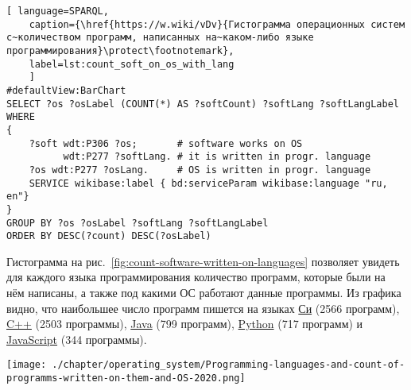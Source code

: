 % 
\begin{lstlisting}[ language=SPARQL, 
	caption={\href{https://w.wiki/vDv}{Гистограмма операционных систем с~количеством программ, написанных на~каком-либо языке программирования}\protect\footnotemark},
	label=lst:count_soft_on_os_with_lang
	]
#defaultView:BarChart
SELECT ?os ?osLabel (COUNT(*) AS ?softCount) ?softLang ?softLangLabel WHERE
{
    ?soft wdt:P306 ?os;       # software works on OS
          wdt:P277 ?softLang. # it is written in progr. language
    ?os wdt:P277 ?osLang.     # OS is written in progr. language
    SERVICE wikibase:label { bd:serviceParam wikibase:language "ru, en"}
}
GROUP BY ?os ?osLabel ?softLang ?softLangLabel
ORDER BY DESC(?count) DESC(?osLabel)
\end{lstlisting}



\newpage
Гистограмма на рис.~\ref{fig:count-software-written-on-languages} позволяет увидеть для каждого языка программирования количество программ, которые были на нём написаны, а также под какими ОС работают данные программы. Из графика видно, что наибольшее число программ пишется на языках \href{https://www.wikidata.org/wiki/Q15777}{Си} (2566 программ), \href{https://www.wikidata.org/wiki/Q2407}{C++} (2503 программы), \href{https://www.wikidata.org/wiki/Q251}{Java} (799 программ), \href{https://www.wikidata.org/wiki/Q28865}{Python} (717 программ) и \href{https://www.wikidata.org/wiki/Q2005}{JavaScript} (344 программы).

\begin{marginfigure}[0\baselineskip]
	\texttt{[image: ./chapter/operating\_system/Programming-languages-and-count-of-programms-written-on-them-and-OS-2020.png]}
    \caption[Число программ с разбивкой по языкам и ОС, 2020 год.]{Число программ с разбивкой по языкам программирования и операционным системам, 2020 год. Ссылка на SPARQL-запрос: \href{https://w.wiki/4c7d}{https://w.wiki/4c7d}}
	\label{fig:count-software-written-on-languages}
\end{marginfigure}

